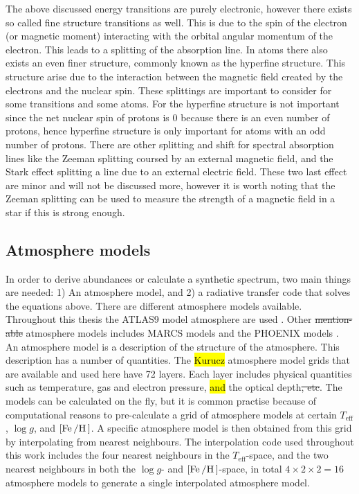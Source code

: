 The above discussed energy transitions are purely electronic, however there exists so called fine
structure transitions as well. This is due to the spin of the electron (or magnetic moment)
interacting with the orbital angular momentum of the electron. This leads to a splitting of the
absorption line. In atoms there also exists an even finer structure, commonly known as the hyperfine
structure. This structure arise due to the interaction between the magnetic field created by the
electrons and the nuclear spin. These splittings are important to consider for some transitions and
some atoms. For  the hyperfine structure is not important since the net nuclear spin of
protons is 0 because there is an even number of protons, hence hyperfine structure is only important
for atoms with an odd number of protons. There are other splitting and shift for spectral absorption
lines like the Zeeman splitting coursed by an external magnetic field, and the Stark effect
splitting a line due to an external electric field. These two last effect are minor and will not be
discussed more, however it is worth noting that the Zeeman splitting can be used to measure the
strength of a magnetic field in a star if this is strong enough.



\subsection{Atmosphere models}
\label{sec:atmospheremodels}

In order to derive abundances or calculate a synthetic spectrum, two main things are needed: 1) An
atmosphere model, and 2) a radiative transfer code that solves the equations above. There are
different atmosphere models available. Throughout this thesis the ATLAS9 model atmosphere are used
\citep{Kurucz1993}. Other \st{mention-able} atmosphere models includes MARCS models
\citep{Gustafson2008} and the PHOENIX models \citep{Husser2013}. An atmosphere model is a
description of the structure of the atmosphere. This description has a number of quantities. The
\hl{Kurucz} atmosphere model grids that are available and used here have 72 layers. Each layer
includes physical quantities such as temperature, gas and electron pressure, \hl{and} the optical
depth\st{, etc}. The models can be calculated on the fly, but it is common practise because of
computational reasons to pre-calculate a grid of atmosphere models at certain $T_\mathrm{eff}$,
$\log g$, and $[\ion{Fe}/\ion{H}]$. A specific atmosphere model is then obtained from this grid by
interpolating from nearest neighbours. The interpolation code used throughout this work includes the
four nearest neighbours in the $T_\mathrm{eff}$-space, and the two nearest neighbours in both the
$\log g$- and $[\ion{Fe}/\ion{H}]$-space, in total $4\times2\times2=16$ atmosphere models to
generate a single interpolated atmosphere model.



